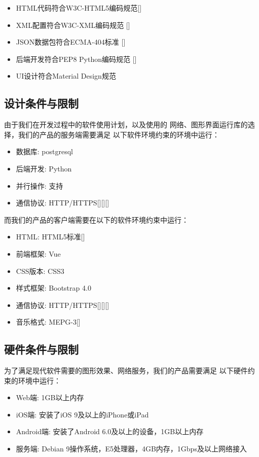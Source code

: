         \begin{itemize}
            \item HTML代码符合W3C-HTML5编码规范[\cite{hickson2011html5}]
            \item XML配置符合W3C-XML编码规范 [\cite{bray1997extensible}]
            \item JSON数据包符合ECMA-404标准 [\cite{bray2017javascript}]
            \item 后端开发符合PEP8 Python编码规范 [\cite{van2001pep}]
            \item UI设计符合Material Design规范
        \end{itemize}

\subsection{设计条件与限制} %

    由于我们在开发过程中的软件使用计划，以及使用的
    网络、图形界面运行库的选择，我们的产品的服务端需要满足
    以下软件环境约束的环境中运行：
    \begin{itemize}
        \item 数据库: postgresql
        \item 后端开发: Python
        \item 并行操作: 支持
        \item 通信协议: HTTP/HTTPS[\cite{berners1996hypertext}][\cite{fielding1999hypertext}][\cite{rescorla2000http}]
    \end{itemize}

    而我们的产品的客户端需要在以下的软件环境约束中运行：
    \begin{itemize}
    \item HTML: HTML5标准[\cite{hickson2011html5}]
    \item 前端框架: Vue
    \item CSS版本: CSS3
    \item 样式框架: Bootstrap 4.0
    \item 通信协议: HTTP/HTTPS[\cite{berners1996hypertext}][\cite{fielding1999hypertext}][\cite{rescorla2000http}]
    \item 音乐格式: MEPG-3[\cite{le1991mpeg}]
\end{itemize}

\subsection{硬件条件与限制} %

        为了满足现代软件需要的图形效果、网络服务，我们的产品需要满足
        以下硬件约束的环境中运行：
        \begin{itemize}
            \item Web端: 1GB以上内存
            \item iOS端: 安装了iOS 9及以上的iPhone或iPad
            \item Android端: 安装了Android 6.0及以上的设备，1GB以上内存
            \item 服务端: Debian 9操作系统，E5处理器，4GB内存，1Gbps及以上网络接入
        \end{itemize}

